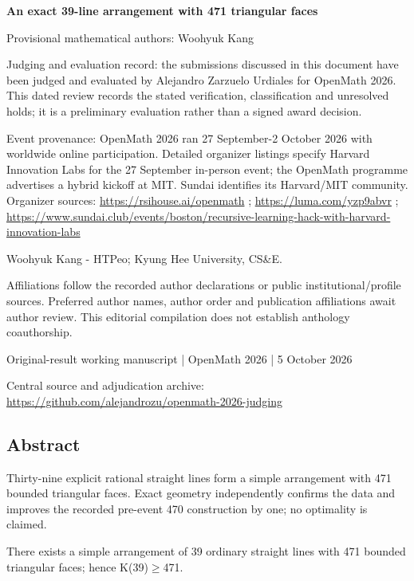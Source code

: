 \documentclass[11pt,a4paper]{article}
\begin{document}
{\LARGE\bfseries An exact 39-line arrangement with 471 triangular faces\par}\medskip
{\small Provisional mathematical authors: Woohyuk Kang\par}\medskip
{\small Judging and evaluation record: the submissions discussed in this document have been judged and evaluated by Alejandro Zarzuelo Urdiales for OpenMath 2026. This dated review records the stated verification, classification and unresolved holds; it is a preliminary evaluation rather than a signed award decision.\par}

{\small Event provenance: OpenMath 2026 ran 27 September-2 October 2026 with worldwide online participation. Detailed organizer listings specify Harvard Innovation Labs for the 27 September in-person event; the OpenMath programme advertises a hybrid kickoff at MIT. Sundai identifies its Harvard/MIT community. Organizer sources: \url{https://rsihouse.ai/openmath} ; \url{https://luma.com/yzp9abvr} ; \url{https://www.sundai.club/events/boston/recursive-learning-hack-with-harvard-innovation-labs}\par}

{\small Woohyuk Kang  -  HTPeo; Kyung Hee University, CS\&E.\par}

{\small Affiliations follow the recorded author declarations or public institutional/profile sources. Preferred author names, author order and publication affiliations await author review. This editorial compilation does not establish anthology coauthorship.\par}

{\small Original-result working manuscript | OpenMath 2026 | 5 October 2026\par}\medskip
{\small Central source and adjudication archive: \url{https://github.com/alejandrozu/openmath-2026-judging}\par}

\subsection{Abstract}
Thirty-nine explicit rational straight lines form a simple arrangement with 471 bounded triangular faces. Exact geometry independently confirms the data and improves the recorded pre-event 470 construction by one; no optimality is claimed.

There exists a simple arrangement of 39 ordinary straight lines with 471 bounded triangular faces; hence K(39)\ensuremath{\geq}471.
\end{document}
